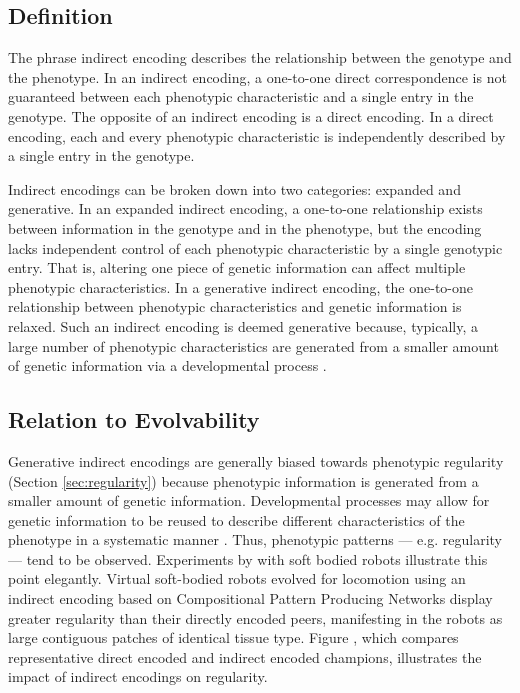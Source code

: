 \subsection{Definition}
The phrase indirect encoding describes the relationship between the genotype and the phenotype. In an indirect encoding, a one-to-one direct correspondence is not guaranteed between each phenotypic characteristic and a single entry in the genotype. The opposite of an indirect encoding is a direct encoding. In a direct encoding, each and every phenotypic characteristic is independently described by a single entry in the genotype.

Indirect encodings can be broken down into two categories: expanded and generative. In an expanded indirect encoding, a one-to-one relationship exists between information in the genotype and in the phenotype, but the encoding lacks independent control of each phenotypic characteristic by a single genotypic entry. That is, altering one piece of genetic information can affect multiple phenotypic characteristics. In a generative indirect encoding, the one-to-one relationship between phenotypic characteristics and genetic information is relaxed. Such an indirect encoding is deemed generative because, typically, a large number of phenotypic characteristics are generated from a smaller amount of genetic information via a developmental process \cite[p 175]{Downing2015IntelligenceSystems}.

\subsection{Relation to Evolvability}

Generative indirect encodings are generally biased towards phenotypic regularity (Section \ref{sec:regularity}) because phenotypic information is generated from a smaller amount of genetic information. Developmental processes may allow for genetic information to be reused to describe different characteristics of the phenotype in a systematic manner  \cite{Clune2011OnRegularity}. Thus, phenotypic patterns --- e.g. regularity --- tend to be observed. Experiments by \cite{Cheney2013UnshacklingEncoding} with soft bodied robots illustrate this point elegantly. Virtual soft-bodied robots evolved for locomotion using an indirect encoding based on Compositional Pattern Producing Networks display greater regularity than their directly encoded peers, manifesting in the robots as large contiguous patches of identical tissue type. Figure , which compares representative direct encoded and indirect encoded champions, illustrates the impact of indirect encodings on regularity.

